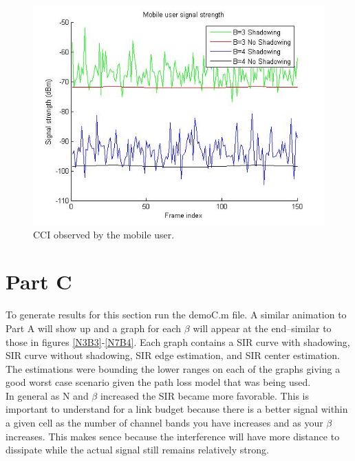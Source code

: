 \documentclass{article}
\begin{document}
\begin{figure}[h]
\centerline{\includegraphics[width=5in]{latex/images/PARTB.jpg}}
\caption{CCI observed by the mobile user.}
\label{partb}
\end{figure}


\clearpage

\section{Part C}\label{partC}

To generate results for this section run the demoC.m file. A similar animation to Part A will show up and a graph for each \(\beta\) will appear at the end--similar to those in figures \ref{N3B3}-\ref{N7B4}. Each graph contains a SIR curve with shadowing, SIR curve without shadowing, SIR edge estimation, and SIR center estimation. The estimations were bounding the lower ranges on each of the graphs giving a good worst case scenario given the path loss model that was being used. \\

In general as N and \( \beta \) increased the SIR became more favorable. This is important to understand for a link budget because there is a better signal within a given cell as the number of channel bands you have increases and as your \( \beta \) increases. This makes sence because the interference will have more distance to dissipate while the actual signal still remains relatively strong.
\end{document}
